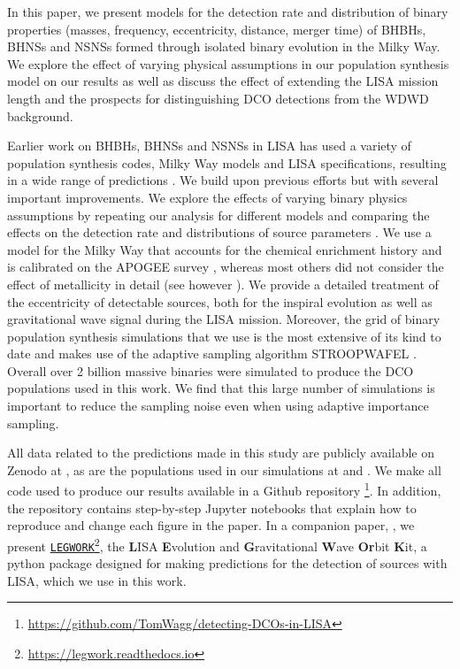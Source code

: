 In this paper, we present models for the detection rate and distribution of binary properties (masses, frequency, eccentricity, distance, merger time) of BHBHs, BHNSs and NSNSs formed through isolated binary evolution in the Milky Way. We explore the effect of varying physical assumptions in our population synthesis model on our results as well as discuss the effect of extending the LISA mission length and the prospects for distinguishing DCO detections from the WDWD background.

Earlier work on BHBHs, BHNSs and NSNSs in LISA has used a variety of population synthesis codes, Milky Way models and LISA specifications, resulting in a wide range of predictions \citep{Nelemans+2001,Belczynski+2010,Liu+2014,Lamberts+2019,Lau+2020,Breivik+2020,Sesana+2020, Shao+2021}. We build upon previous efforts but with several important improvements. We explore the effects of varying binary physics assumptions by repeating our analysis for \nModels{} different models and comparing the effects on the detection rate and distributions of source parameters \citep{Broekgaarden+2021,Broekgaarden+2021b}. We use a model for the Milky Way that accounts for the chemical enrichment history and is calibrated on the APOGEE survey \citep{Majewski+2017,Frankel+2018}, whereas most others did not consider the effect of metallicity in detail (see however \citealp{Lamberts+2019, Sesana+2020}). We provide a detailed treatment of the eccentricity of detectable sources, both for the inspiral evolution as well as gravitational wave signal during the LISA mission. Moreover, the grid of binary population synthesis simulations that we use is the most extensive of its kind to date and makes use of the adaptive sampling algorithm STROOPWAFEL \citep{Broekgaarden+2019, Broekgaarden+2021}. Overall over 2 billion massive binaries were simulated to produce the DCO populations used in this work. We find that this large number of simulations is important to reduce the sampling noise even when using adaptive importance sampling.

All data related to the predictions made in this study are publicly available on Zenodo at \citet{Wagg+2021_zenodo}, as are the populations used in our simulations at \citet[][BHBH]{Broekgaarden:2021-zenodo-BHBH} \citet[][BHNS]{Broekgaarden:2021-zenodo-BHNS} and  \citet[][NSNS]{Broekgaarden:2021-zenodo-NSNS}. We make all code used to produce our results available in a Github repository \href{https://github.com/TomWagg/detecting-DCOs-in-LISA}{\faGithub}\footnote{\url{https://github.com/TomWagg/detecting-DCOs-in-LISA}}. In addition, the repository contains step-by-step Jupyter notebooks that explain how to reproduce and change each figure in the paper. In a companion paper, \citet{Wagg+2021}, we present \href{https://legwork.readthedocs.io}{\texttt{LEGWORK}}\footnote{\url{https://legwork.readthedocs.io}}, the \textbf{L}ISA \textbf{E}volution and \textbf{G}ravitational \textbf{W}ave \textbf{Or}bit \textbf{K}it, a python package designed for making predictions for the detection of sources with LISA, which we use in this work.

